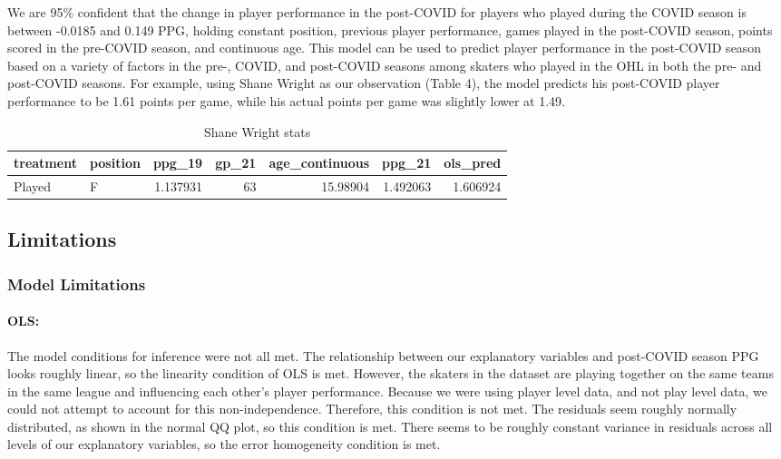 \documentclass[12pt]{article}
\begin{document}
We are 95\% confident that the change in player performance in the
post-COVID for players who played during the COVID season is between
-0.0185 and 0.149 PPG, holding constant position, previous player
performance, games played in the post-COVID season, points scored in the
pre-COVID season, and continuous age. This model can be used to predict
player performance in the post-COVID season based on a variety of
factors in the pre-, COVID, and post-COVID seasons among skaters who
played in the OHL in both the pre- and post-COVID seasons. For example,
using Shane Wright as our observation (Table 4), the model predicts his
post-COVID player performance to be 1.61 points per game, while his
actual points per game was slightly lower at 1.49.

\begin{table}
\caption{\label{Table 4.}Shane Wright stats}
\centering
\begin{tabular}{l|l|r|r|r|r|r}
\hline
treatment & position & ppg\_19 & gp\_21 & age\_continuous & ppg\_21 & ols\_pred\\
\hline
Played & F & 1.137931 & 63 & 15.98904 & 1.492063 & 1.606924\\
\hline
\end{tabular}
\end{table}

\hypertarget{limitations}{%
\subsection{Limitations}\label{limitations}}

\hypertarget{model-limitations}{%
\subsubsection{Model Limitations}\label{model-limitations}}

\hypertarget{ols-1}{%
\paragraph{OLS:}\label{ols-1}}

The model conditions for inference were not all met. The relationship
between our explanatory variables and post-COVID season PPG looks
roughly linear, so the linearity condition of OLS is met. However, the
skaters in the dataset are playing together on the same teams in the
same league and influencing each other's player performance. Because we
were using player level data, and not play level data, we could not
attempt to account for this non-independence. Therefore, this condition
is not met. The residuals seem roughly normally distributed, as shown in
the normal QQ plot, so this condition is met. There seems to be roughly
constant variance in residuals across all levels of our explanatory
variables, so the error homogeneity condition is met.
\end{document}
